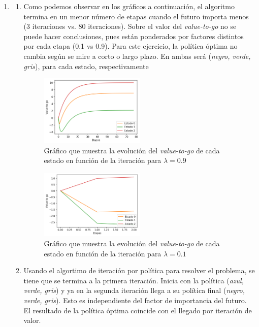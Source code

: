 \documentclass[letterpaper,10pt]{article}
\begin{document}
\begin{enumerate}
\begin{itemize}
        
        \end{itemize}
    \item
    \begin{enumerate}
        \item Como podemos observar en los gráficos a continuación, el algoritmo termina en un menor número de etapas cuando el futuro importa menos (3 iteraciones vs. 80 iteraciones). Sobre el valor del \textit{value-to-go} no se puede hacer conclusiones, pues están ponderados por factores distintos por cada etapa (0.1 vs 0.9). Para este ejercicio, la política óptima no cambia según se mire a corto o largo plazo. En ambas será (\textit{negro, verde, gris}), para cada estado, respectivamente
        \begin{figure}[h]
          \centering
            \includegraphics[width=0.5\textwidth]{graphp32a09}
          \caption{Gráfico que muestra la evolución del \textit{value-to-go} de cada estado en función de la  iteración para $\lambda=0.9$}
          \label{iteration 0.9}
        \end{figure}
        \begin{figure}[h]
          \centering
            \includegraphics[width=0.5\textwidth]{graphp32a01}
          \caption{Gráfico que muestra la evolución del \textit{value-to-go} de cada estado en función de la  iteración para $\lambda=0.1$}
          \label{iteration 0.1}
        \end{figure}
        
        \item Usando el algortimo de iteración por política para resolver el problema, se tiene que se termina a la primera iteración. Inicia con la política (\textit{azul, verde, gris}) y ya en la segunda iteración llega a su política final (\textit{negro, verde, gris}). Esto es independiente del factor de importancia del futuro. El resultado de la política óptima coincide con el llegado por iteración de valor.
        

\end{enumerate}
\end{enumerate}
\end{document}

